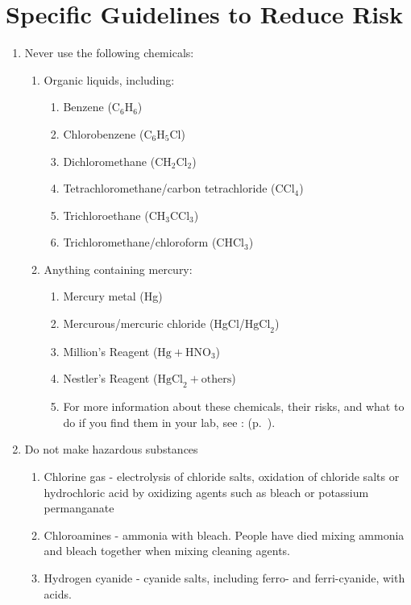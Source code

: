 \section{Specific Guidelines to Reduce Risk}
\label{sub:specguide}
\begin{enumerate}

\item{Never use the following chemicals:}
\begin{enumerate}
\item{Organic liquids, including:}
\begin{enumerate}
\item{Benzene ($\mbox{C}_{6}\mbox{H}_{6}$)}
\item{Chlorobenzene ($\mbox{C}_{6}\mbox{H}_{5}\mbox{Cl}$)}
\item{Dichloromethane ($\mbox{CH}_{2}\mbox{Cl}_{2}$)}
\item{Tetrachloromethane/carbon tetrachloride ($\mbox{CCl}_{4}$)}
\item{Trichloroethane ($\mbox{CH}_{3}\mbox{CCl}_{3}$)}
\item{Trichloromethane/chloroform ($\mbox{CHCl}_{3}$)}
\end{enumerate}
\item{Anything containing mercury:}
\begin{enumerate}
\item{Mercury metal (Hg)}
\item{Mercurous/mercuric chloride (HgCl/$\mbox{HgCl}_{2}$)}
\item{Million's Reagent ($\mbox{Hg}+\mbox{HNO}_{3}$)}
\item{Nestler's Reagent ($\mbox{HgCl}_{2}+\mbox{others}$)}
\item{For more information about these chemicals, their risks, 
and what to do if you find them in your lab, 
see :  (p.~\pageref{cha:dangerchem})}.
\end{enumerate}
\end{enumerate}

\item{Do not make hazardous substances}
\begin{enumerate}
\item{Chlorine gas - electrolysis of chloride salts, 
oxidation of chloride salts or hydrochloric acid 
by oxidizing agents such as bleach or potassium permanganate}
\item{Chloroamines - ammonia with bleach. People have died 
mixing ammonia and bleach together when mixing cleaning agents.}
\item{Hydrogen cyanide - cyanide salts, 
including ferro- and ferri-cyanide, with acids.}
\end{enumerate}


\end{enumerate}
